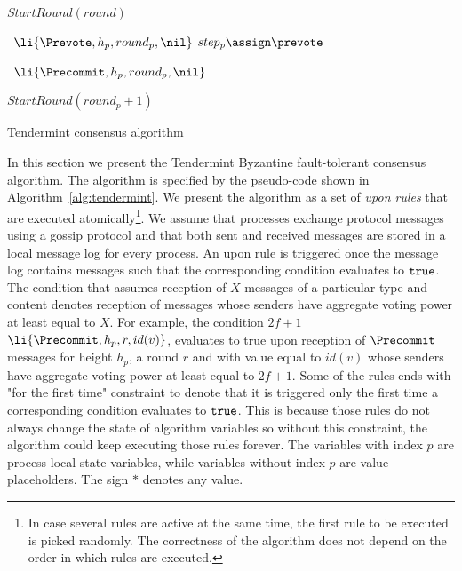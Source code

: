 \begin{algorithm}[htb!]
\begin{algorithmic}[1]
		\SHORTSPACE 
		\label{line:tab:skipRounds} 
			\STATE $StartRound(round)$ \label{line:tab:nextRound2} 
		\ENDUPON
		
		\SHORTSPACE 
		 \label{line:tab:onTimeoutPropose} 
			\STATE \Broadcast \ $\li{\Prevote,h_p,round_p, \nil}$ 
		 	\label{line:tab:prevote-nil-on-timeout}	
		 	\STATE $step_p \assign \prevote$ 
		 \ENDIF	
		 \ENDFUNCTION
		
		\SHORTSPACE 
		 \label{line:tab:onTimeoutPrevote} 
			\STATE \Broadcast \ $\li{\Precommit,h_p,round_p,\nil}$   
			\label{line:tab:precommit-nil-onTimeout}
		\ENDIF	
		\ENDFUNCTION
		
		\SHORTSPACE 
		 \label{line:tab:onTimeoutPrecommit} 
			\STATE $StartRound(round_p + 1)$ \label{line:tab:nextRound} 
		\ENDIF
		\ENDFUNCTION	
	\end{algorithmic} \caption{Tendermint consensus algorithm}
	\label{alg:tendermint} 
\end{algorithm}

In this section we present the Tendermint Byzantine fault-tolerant consensus
algorithm. The algorithm is specified by the pseudo-code shown in
Algorithm~\ref{alg:tendermint}. We present the algorithm as a set of \emph{upon
rules} that are executed atomically\footnote{In case several rules are active
at the same time, the first rule to be executed is picked randomly. The
correctness of the algorithm does not depend on the order in which rules are
executed.}. We assume that processes exchange protocol messages using a gossip
protocol and that both sent and received messages are stored in a local message
log for every process. An upon rule is triggered once the message log contains
messages such that the corresponding condition evaluates to $\tt{true}$. The
condition that assumes reception of $X$ messages of a particular type and
content denotes reception of messages whose senders have aggregate voting power at
least equal to $X$. For example, the condition $2f+1$ $\li{\Precommit,h_p,r,id(v)}$,  
evaluates to true upon reception of $\Precommit$ messages for height $h_p$, 
a round $r$ and with value equal to $id(v)$ whose senders have aggregate voting 
power at least equal to $2f+1$. Some of the rules ends with "for the first time" constraint 
to denote that it is triggered only the first time a corresponding condition evaluates 
to $\tt{true}$. This is because those rules do not always change the state of algorithm 
variables so without this constraint, the algorithm could keep 
executing those rules forever. The variables with index $p$ are process local state
variables, while variables without index $p$ are value placeholders. The sign
$*$ denotes any value.    

